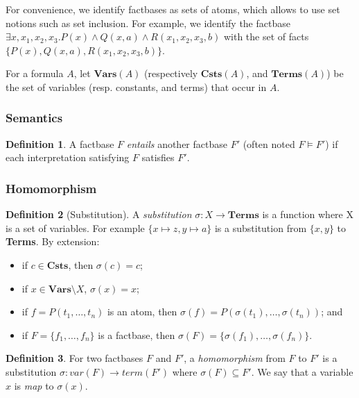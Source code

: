 \documentclass{article}
\theoremstyle{definition}
\newtheorem{definition}{Definition}[section]
\theoremstyle{remark}
\newcommand{\Vars}{\textbf{Vars}}
\newcommand{\Terms}{\textbf{Terms}}
\newcommand{\Csts}{\textbf{Csts}}
\begin{document}
For convenience, we identify factbases as sets of atoms, which allows to  use  set  notions  such  as  set inclusion. For example, we identify the factbase $\exists x,x_{1},x_{2},x_{3}. P(x) \land Q(x,a) \land R(x_{1},x_{2},x_{3},b)$ with the set of facts $\{P(x),Q(x,a),R(x_{1},x_{2},x_{3},b)\}$.

For a formula $A$, let \emph{$\Vars(A)$} (respectively \emph{$\Csts(A)$}, and \emph{$\Terms(A)$}) be the set of variables (resp. constants, and terms) that occur in $A$.

\subsubsection{Semantics}

\begin{definition}
A factbase $F$ \emph{entails} another factbase $F'$ (often noted $F \models F'$) if each interpretation satisfying $F$ satisfies $F'$.
\end{definition}	

\subsubsection{Homomorphism}

\begin{definition}[Substitution]
A \emph{substitution} $\sigma:X \to \Terms$ is a function where X is a set of variables. For example $\{x \mapsto z, y \mapsto a \}$ is a substitution from $\{x,y\}$ to \Terms. By extension: 
\begin{itemize}
\item if $c \in \Csts$, then $\sigma(c) = c$;
\item if $x \in \Vars \setminus X$, $\sigma(x) = x$;
\item if $f = P(t_1,\ldots,t_n)$ is an atom, then $\sigma(f) = P(\sigma(t_1),\ldots,\sigma(t_n))$; and
\item if $F = \{f_1,\ldots,f_n\}$ is a factbase, then $\sigma(F) = \{\sigma(f_1),\ldots,\sigma(f_n)\}$.
\end{itemize}
\end{definition}

\begin{definition}
For two factbases $F$ and $F'$, a \emph{homomorphism} from $F$ to $F'$ is a substitution $\sigma:var(F) \to term(F')$ where $\sigma(F) \subseteq F'$. We say that a variable $x$ is \emph{map} to $\sigma(x)$.
\end{definition}
\end{document}
